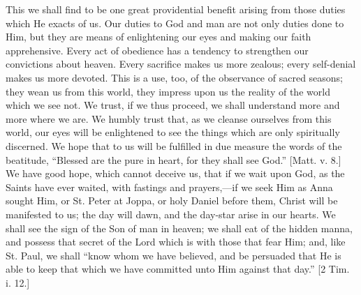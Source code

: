 This we shall find to be one great providential benefit arising from
those duties which He exacts of us. Our duties to God and man are not
only duties done to Him, but they are means of enlightening our eyes and
making our faith apprehensive. Every act of obedience has a tendency to
strengthen our convictions about heaven. Every sacrifice makes us more
zealous; every self-denial makes us more devoted. This is a use, too, of
the observance of sacred seasons; they wean us from this world, they
impress upon us the reality of the world which we see not. We trust, if
we thus proceed, we shall understand more and more where we are. We
humbly trust that, as we cleanse ourselves from this world, our eyes
will be enlightened to see the things which are only spiritually
discerned. We hope that to us will be fulfilled in due measure the words
of the beatitude, ``Blessed are the pure in heart, for they shall
see God.'' [Matt. v. 8.] We have good hope, which cannot deceive us,
that if we wait upon God, as the Saints have ever waited, with fastings
and prayers,—if we seek Him as Anna sought Him, or St. Peter at Joppa,
or holy Daniel before them, Christ will be manifested to us; the day
will dawn, and the day-star arise in our hearts. We shall see the sign
of the Son of man in heaven; we shall eat of the hidden manna, and
possess that secret of the Lord which is with those that fear Him; and,
like St. Paul, we shall ``know whom we have believed, and be
persuaded that He is able to keep that which we have committed unto Him
against that day.'' [2 Tim. i. 12.]

